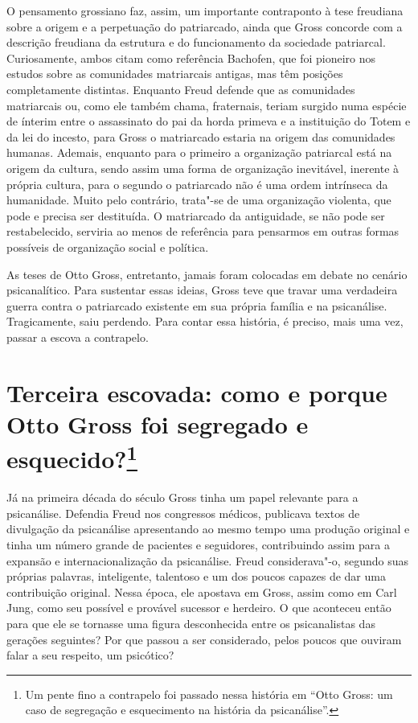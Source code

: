 O pensamento grossiano faz, assim, um importante contraponto à tese
freudiana sobre a origem e a perpetuação do patriarcado, ainda que Gross
concorde com a descrição freudiana da estrutura e do funcionamento da
sociedade patriarcal. Curiosamente, ambos citam como referência
Bachofen, que foi pioneiro nos estudos sobre as comunidades matriarcais
antigas, mas têm posições completamente distintas. Enquanto Freud
defende que as comunidades matriarcais ou, como ele também chama,
fraternais, teriam surgido numa espécie de ínterim entre o assassinato
do pai da horda primeva e a instituição do Totem e da lei do incesto,
para Gross o matriarcado estaria na origem das comunidades humanas.
Ademais, enquanto para o primeiro a organização patriarcal está na
origem da cultura, sendo assim uma forma de organização inevitável,
inerente à própria cultura, para o segundo o patriarcado não é uma ordem
intrínseca da humanidade. Muito pelo contrário, trata"-se de uma
organização violenta, que pode e precisa ser destituída. O matriarcado
da antiguidade, se não pode ser restabelecido, serviria ao menos de
referência para pensarmos em outras formas possíveis de organização
social e política.

As teses de Otto Gross, entretanto, jamais foram colocadas em debate no
cenário psicanalítico. Para sustentar essas ideias, Gross teve que
travar uma verdadeira guerra contra o patriarcado existente em sua
própria família e na psicanálise. Tragicamente, saiu perdendo. Para
contar essa história, é preciso, mais uma vez, passar a escova a
contrapelo.

\section{Terceira escovada: como e porque Otto Gross foi segregado e
esquecido?\protect\footnote{\uppercase{U}m pente fino a contrapelo foi passado nessa
  história em ``\uppercase{O}tto \uppercase{G}ross: um caso de segregação e esquecimento na
  história da psicanálise''.}}

Já na primeira década do século  Gross tinha um papel relevante para a
psicanálise. Defendia Freud nos congressos médicos, publicava textos de
divulgação da psicanálise apresentando ao mesmo tempo uma produção
original e tinha um número grande de pacientes e seguidores,
contribuindo assim para a expansão e internacionalização da psicanálise.
Freud considerava"-o, segundo suas próprias palavras, inteligente,
talentoso e um dos poucos capazes de dar uma contribuição original.
Nessa época, ele apostava em Gross, assim como em Carl Jung, como seu
possível e provável sucessor e herdeiro. O que aconteceu então para que
ele se tornasse uma figura desconhecida entre os psicanalistas das
gerações seguintes? Por que passou a ser considerado, pelos poucos que
ouviram falar a seu respeito, um psicótico?

